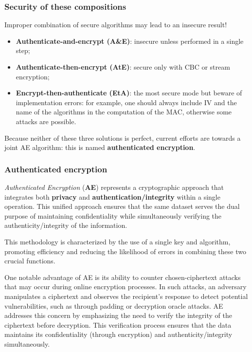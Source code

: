 \subsubsection{Security of these compositions}
Improper combination of secure algorithms may lead to an insecure result!
\begin{itemize}
	\item \textbf{Authenticate-and-encrypt (A\&E)}: insecure unless performed in a single step;
	\item \textbf{Authenticate-then-encrypt (AtE)}: secure only with CBC or stream encryption;
	\item \textbf{Encrypt-then-authenticate (EtA)}: the most secure mode but beware of implementation errors: for example, one should always include IV and the name of the algorithms in the computation of the MAC, otherwise some attacks are possible.
\end{itemize}
Because neither of these three solutions is perfect, current efforts are towards a joint AE algorithm: this is named \textbf{authenticated encryption}.


\subsubsection{Authenticated encryption}\label{chap:ae}

\textit{Authenticated Encryption} (\textbf{AE}) represents a cryptographic approach that integrates both \textbf{privacy} and \textbf{authentication/integrity} within a single operation.
This unified approach ensures that the same dataset serves the dual purpose of maintaining confidentiality while simultaneously verifying the authenticity/integrity of the information.

This methodology is characterized by the use of a single key and algorithm, promoting efficiency and reducing the likelihood of errors in combining these two crucial functions.

One notable advantage of AE is its ability to counter chosen-ciphertext attacks that may occur during online encryption processes. In such attacks, an adversary manipulates a ciphertext and observes the recipient's response to detect potential vulnerabilities, such as through padding or decryption oracle attacks. AE addresses this concern by emphasizing the need to verify the integrity of the ciphertext before decryption. This verification process ensures that the data maintains its confidentiality (through encryption) and authenticity/integrity simultaneously.


